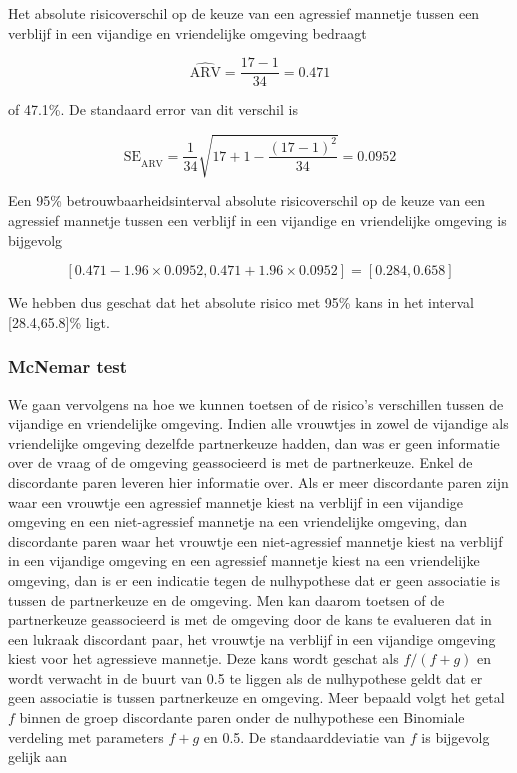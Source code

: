 \documentclass[
  12pt,dutch]{book}
\theoremstyle{definition}
\theoremstyle{definition}
\theoremstyle{definition}
\theoremstyle{definition}
\theoremstyle{remark}
\begin{document}
Het absolute risicoverschil op de keuze van een agressief mannetje tussen een verblijf in een vijandige en vriendelijke omgeving bedraagt

\begin{equation*}
\widehat{\text{ARV}}=\frac{17-1}{34}=0.471
\end{equation*}

of 47.1\%. De standaard error van dit verschil is

\begin{equation*}
\text{SE}_{\widehat{\text{ARV}}}=\frac{1}{34}\sqrt{17+1-\frac{(17-1)^2}{34}}=0.0952
\end{equation*}

Een 95\% betrouwbaarheidsinterval absolute risicoverschil op de keuze van een agressief mannetje tussen een verblijf in een vijandige en vriendelijke omgeving is bijgevolg

\begin{equation*}
\left[0.471-1.96\times 0.0952,0.471+1.96\times 0.0952\right]=[0.284,0.658]
\end{equation*}

We hebben dus geschat dat het absolute risico met 95\% kans in het interval {[}28.4,65.8{]}\% ligt.

\subsubsection{McNemar test}\label{mcnemar-test}

We gaan vervolgens na hoe we kunnen toetsen of de risico's verschillen tussen de vijandige en vriendelijke omgeving.
Indien alle vrouwtjes in zowel de vijandige als vriendelijke omgeving dezelfde partnerkeuze hadden, dan was er geen informatie over de vraag of de omgeving geassocieerd is met de partnerkeuze. Enkel de discordante paren leveren hier informatie over. Als
er meer discordante paren zijn waar een vrouwtje een agressief mannetje kiest na verblijf in een vijandige omgeving en een niet-agressief mannetje na een vriendelijke omgeving, dan discordante paren waar het vrouwtje een niet-agressief mannetje kiest na verblijf in een vijandige omgeving en een agressief mannetje kiest na een vriendelijke omgeving, dan is er een
indicatie tegen de nulhypothese dat er geen associatie is tussen de partnerkeuze en de omgeving.
Men kan daarom toetsen of de partnerkeuze geassocieerd is met de omgeving door de kans te evalueren dat in een
lukraak discordant paar, het vrouwtje na verblijf in een vijandige omgeving kiest voor het agressieve mannetje.
Deze kans wordt geschat als \(f/(f+g)\) en wordt verwacht in de buurt
van 0.5 te liggen als de nulhypothese geldt dat er geen associatie is tussen partnerkeuze en omgeving.
Meer bepaald volgt het getal \(f\) binnen de
groep discordante paren onder de nulhypothese een Binomiale verdeling met
parameters \(f+g\) en 0.5. De standaarddeviatie van \(f\) is bijgevolg gelijk
aan
\end{document}
